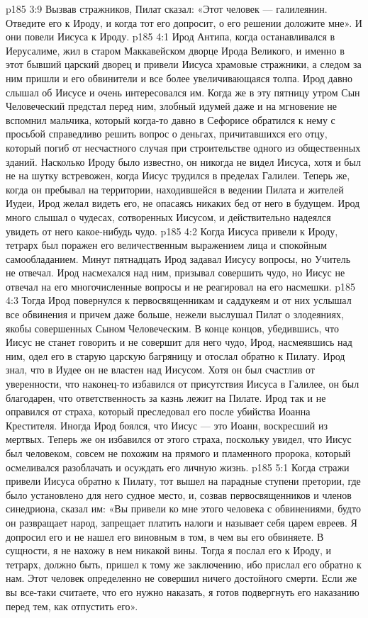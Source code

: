 \vs p185 3:9 Вызвав стражников, Пилат сказал: «Этот человек --- галилеянин. Отведите его к Ироду, и когда тот его допросит, о его решении доложите мне». И они повели Иисуса к Ироду.
\vs p185 4:1 Ирод Антипа, когда останавливался в Иерусалиме, жил в старом Маккавейском дворце Ирода Великого, и именно в этот бывший царский дворец и привели Иисуса храмовые стражники, а следом за ним пришли и его обвинители и все более увеличивающаяся толпа. Ирод давно слышал об Иисусе и очень интересовался им. Когда же в эту пятницу утром Сын Человеческий предстал перед ним, злобный идумей даже и на мгновение не вспомнил мальчика, который когда\hyp{}то давно в Сефорисе обратился к нему с просьбой справедливо решить вопрос о деньгах, причитавшихся его отцу, который погиб от несчастного случая при строительстве одного из общественных зданий. Насколько Ироду было известно, он никогда не видел Иисуса, хотя и был не на шутку встревожен, когда Иисус трудился в пределах Галилеи. Теперь же, когда он пребывал на территории, находившейся в ведении Пилата и жителей Иудеи, Ирод желал видеть его, не опасаясь никаких бед от него в будущем. Ирод много слышал о чудесах, сотворенных Иисусом, и действительно надеялся увидеть от него какое\hyp{}нибудь чудо.
\vs p185 4:2 Когда Иисуса привели к Ироду, тетрарх был поражен его величественным выражением лица и спокойным самообладанием. Минут пятнадцать Ирод задавал Иисусу вопросы, но Учитель не отвечал. Ирод насмехался над ним, призывал совершить чудо, но Иисус не отвечал на его многочисленные вопросы и не реагировал на его насмешки.
\vs p185 4:3 Тогда Ирод повернулся к первосвященникам и саддукеям и от них услышал все обвинения и причем даже больше, нежели выслушал Пилат о злодеяниях, якобы совершенных Сыном Человеческим. В конце концов, убедившись, что Иисус не станет говорить и не совершит для него чудо, Ирод, насмеявшись над ним, одел его в старую царскую багряницу и отослал обратно к Пилату. Ирод знал, что в Иудее он не властен над Иисусом. Хотя он был счастлив от уверенности, что наконец\hyp{}то избавился от присутствия Иисуса в Галилее, он был благодарен, что ответственность за казнь лежит на Пилате. Ирод так и не оправился от страха, который преследовал его после убийства Иоанна Крестителя. Иногда Ирод боялся, что Иисус --- это Иоанн, воскресший из мертвых. Теперь же он избавился от этого страха, поскольку увидел, что Иисус был человеком, совсем не похожим на прямого и пламенного пророка, который осмеливался разоблачать и осуждать его личную жизнь.
\vs p185 5:1 Когда стражи привели Иисуса обратно к Пилату, тот вышел на парадные ступени претории, где было установлено для него судное место, и, созвав первосвященников и членов синедриона, сказал им: «Вы привели ко мне этого человека с обвинениями, будто он развращает народ, запрещает платить налоги и называет себя царем евреев. Я допросил его и не нашел его виновным в том, в чем вы его обвиняете. В сущности, я не нахожу в нем никакой вины. Тогда я послал его к Ироду, и тетрарх, должно быть, пришел к тому же заключению, ибо прислал его обратно к нам. Этот человек определенно не совершил ничего достойного смерти. Если же вы все\hyp{}таки считаете, что его нужно наказать, я готов подвергнуть его наказанию перед тем, как отпустить его».
